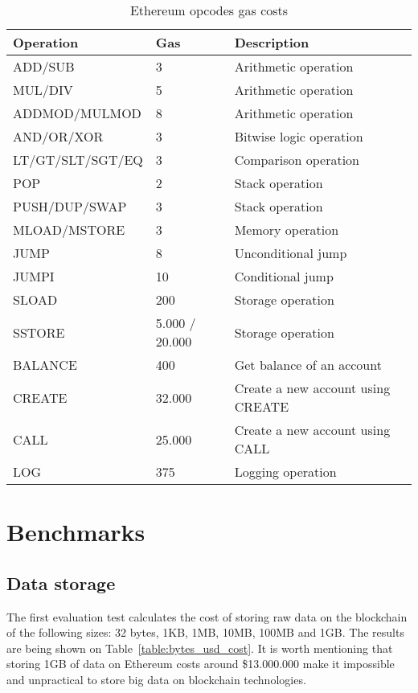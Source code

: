 \begin{table}[!hb]
\centering
\begin{tabular}{|l|l|l|}
\hline
 Operation & Gas  & Description \\ \hline
 ADD/SUB & 3 & Arithmetic operation \\ \hline
 MUL/DIV & 5 & Arithmetic operation \\ \hline
 ADDMOD/MULMOD & 8 & Arithmetic operation \\ \hline
 AND/OR/XOR & 3 & Bitwise logic operation \\ \hline
 LT/GT/SLT/SGT/EQ & 3 & Comparison operation \\ \hline
 POP & 2 & Stack operation \\ \hline
 PUSH/DUP/SWAP & 3 & Stack operation \\ \hline
 MLOAD/MSTORE & 3 & Memory operation \\ \hline
 JUMP & 8 & Unconditional jump \\ \hline
 JUMPI & 10 & Conditional jump \\ \hline
 SLOAD & 200 & Storage operation \\ \hline
 SSTORE & 5.000 / 20.000 & Storage operation \\ \hline
 BALANCE & 400 & Get balance of an account \\ \hline
 CREATE & 32.000 & Create a new account using CREATE \\ \hline
 CALL & 25.000 & Create a new account using CALL \\ \hline
 LOG & 375 & Logging operation \\ \hline
\end{tabular}
\caption{Ethereum opcodes gas costs}
\label{table:opcode_gas_cost}
\end{table}

\clearpage

\section{Benchmarks}
\label{evaluation:benchmarks}

\subsection{Data storage}
\label{evaluation:data_storage}

The first evaluation test calculates the cost of storing raw data on the blockchain of the following sizes: 32 bytes, 1KB, 1MB, 10MB, 100MB and 1GB. The results are being shown on Table~\ref{table:bytes_usd_cost}. It is worth mentioning that storing 1GB of data on Ethereum costs around \$13.000.000 make it impossible and unpractical to store big data on blockchain technologies.

